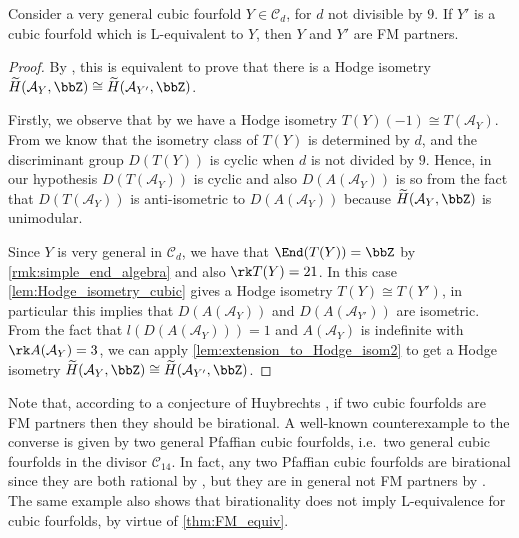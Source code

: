 \documentclass{amsart}
\begin{document}
\begin{theorem}\label{thm:FM_equiv}
    Consider a very general cubic fourfold \(Y\in \mathcal{C}_d\), for \(d\) not divisible by \(9\). If \(Y'\) is a cubic fourfold which is L-equivalent to \(Y\), then \(Y\) and \(Y'\) are FM partners.
\end{theorem}
\begin{proof}
    By \cite[Theorem 1.5 iii)]{huybrechts2017k3}, this is equivalent to prove that there is a Hodge isometry \(\widetilde{H}(\mathcal{A}_Y,\bbZ)\cong\widetilde{H}(\mathcal{A}_{Y'},\bbZ) \).
    
     Firstly, we observe that by \cite[Proposition 2.8]{AT} we have a Hodge isometry \(T(Y)(-1)\cong T(\mathcal{A}_Y)\). From \cite[Lemma 2.4]{Fan_Lai:New_rational} we know that the isometry class of \(T(Y)\) is determined by \(d\), and the discriminant group \(D({T(Y)})\) is cyclic when \(d\) is not divided by \(9\). Hence, in our hypothesis \(D({T(\mathcal{A}_Y)})\) is cyclic and also \(D({A(\mathcal{A}_Y)})\) is so from the fact that \(D({T(\mathcal{A}_Y)})\) is anti-isometric to \(D({A(\mathcal{A}_Y)})\) because \(\widetilde{H}(\mathcal{A}_Y,\bbZ)\) is unimodular.


    Since \(Y\) is very general in \(\mathcal{C}_{d}\), we have that \(\End(T(Y))=\bbZ\) by \autoref{rmk:simple_end_algebra} and also \(\rk T(Y)=21\). In this case \autoref{lem:Hodge_isometry_cubic} gives a Hodge isometry \(T(Y)\cong T(Y')\), in particular this implies that \(D({A(\mathcal{A}_Y)})\) and \(D({A(\mathcal{A}_{Y'})})\) are isometric. From the fact that \(l(D({A(\mathcal{A}_Y)}))=1\) and \(A(\mathcal{A}_Y)\) is indefinite with \(\rk A(\mathcal{A}_Y)=3\), we can apply \autoref{lem:extension_to_Hodge_isom2} to get a Hodge isometry \(\widetilde{H}(\mathcal{A}_Y,\bbZ)\cong\widetilde{H}(\mathcal{A}_{Y'},\bbZ) \).
\end{proof}

\begin{remark}
   Note that, according to a conjecture of Huybrechts \cite[Conjecture 3.21]{huybrechts2023geometry}, if two cubic fourfolds are FM partners then they should be birational. 
A well-known counterexample to the converse is given by two general Pfaffian cubic fourfolds, i.e.\ two general cubic fourfolds in the divisor $\mathcal{C}_{14}$. In fact, any two Pfaffian cubic fourfolds are birational since they are both rational by \cite{beauville1985variete}, but they are in general not FM partners by \cite[Theorem 1.5(iii)]{huybrechts2017k3}. 
The same example also shows that birationality does not imply L-equivalence for cubic fourfolds, by virtue of \autoref{thm:FM_equiv}.
\end{remark}
\end{document}
